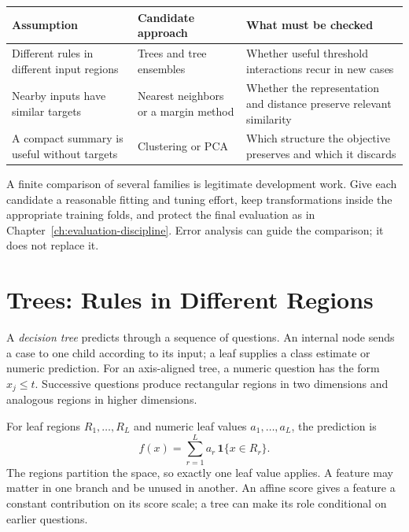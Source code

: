 \par\addvspace{\intextsep}\noindent\begin{minipage}{\linewidth}
\centering\small
\begin{tabular}{@{}L{3.1cm}L{3.1cm}L{3.85cm}@{}}
\toprule
Assumption & Candidate approach & What must be checked \\
\midrule
Different rules in different input regions & Trees and tree ensembles & Whether useful threshold interactions recur in new cases \\
Nearby inputs have similar targets & Nearest neighbors or a margin method & Whether the representation and distance preserve relevant similarity \\
A compact summary is useful without targets & Clustering or PCA & Which structure the objective preserves and which it discards \\
\bottomrule
\end{tabular}
\label{tab:structure-map}
\end{minipage}\par\addvspace{\intextsep}

A finite comparison of several families is legitimate development work. Give each candidate a reasonable fitting and tuning effort, keep transformations inside the appropriate training folds, and protect the final evaluation as in Chapter~\ref{ch:evaluation-discipline}. Error analysis can guide the comparison; it does not replace it.

\section{Trees: Rules in Different Regions}

A \emph{decision tree} predicts through a sequence of questions. An internal node sends a case to one child according to its input; a leaf supplies a class estimate or numeric prediction. For an axis-aligned tree, a numeric question has the form $x_j\le t$. Successive questions produce rectangular regions in two dimensions and analogous regions in higher dimensions.

For leaf regions $R_1,\ldots,R_L$ and numeric leaf values $a_1,\ldots,a_L$, the prediction is
\[
f(x)=\sum_{r=1}^L a_r\,\mathbf1\{x\in R_r\}.
\]
The regions partition the space, so exactly one leaf value applies. A feature may matter in one branch and be unused in another. An affine score gives a feature a constant contribution on its score scale; a tree can make its role conditional on earlier questions.

